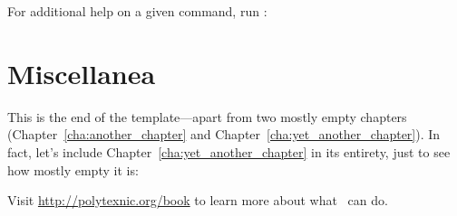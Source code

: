 For additional help on a given command, run :


\section{Miscellanea}

This is the end of the template---apart from two mostly empty chapters (Chapter~\ref{cha:another_chapter} and Chapter~\ref{cha:yet_another_chapter}). In fact, let's include Chapter~\ref{cha:yet_another_chapter} in its entirety, just to see how mostly empty it is:


Visit \href{http://polytexnic.org/book}{http://polytexnic.org/book} to learn more about what \PolyTeXnic\ can do.